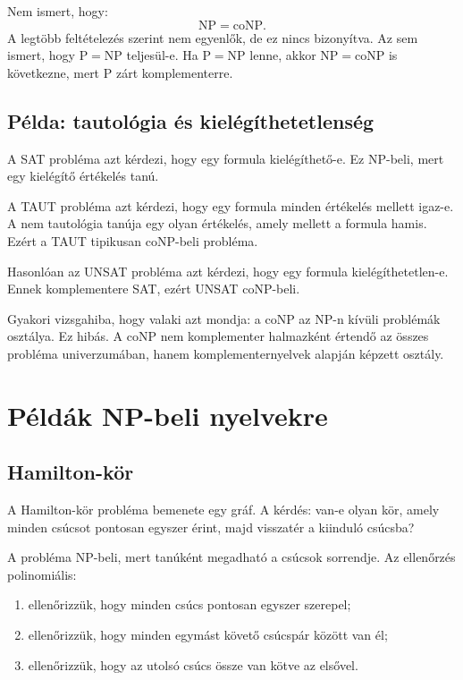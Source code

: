 Nem ismert, hogy:
\[
  \mathrm{NP}=\mathrm{coNP}.
\]
A legtöbb feltételezés szerint nem egyenlők, de ez nincs bizonyítva. Az sem ismert, hogy $\mathrm{P}=\mathrm{NP}$ teljesül-e. Ha $\mathrm{P}=\mathrm{NP}$ lenne, akkor $\mathrm{NP}=\mathrm{coNP}$ is következne, mert $\mathrm{P}$ zárt komplementerre.



\subsection{Példa: tautológia és kielégíthetetlenség}

A SAT probléma azt kérdezi, hogy egy formula kielégíthető-e. Ez $\mathrm{NP}$-beli, mert egy kielégítő értékelés tanú.

A TAUT probléma azt kérdezi, hogy egy formula minden értékelés mellett igaz-e. A nem tautológia tanúja egy olyan értékelés, amely mellett a formula hamis. Ezért a TAUT tipikusan $\mathrm{coNP}$-beli probléma.

Hasonlóan az UNSAT probléma azt kérdezi, hogy egy formula kielégíthetetlen-e. Ennek komplementere SAT, ezért UNSAT $\mathrm{coNP}$-beli.

\begin{warningbox}
Gyakori vizsgahiba, hogy valaki azt mondja: a $\mathrm{coNP}$ az $\mathrm{NP}$-n kívüli problémák osztálya. Ez hibás. A $\mathrm{coNP}$ nem komplementer halmazként értendő az összes probléma univerzumában, hanem komplementernyelvek alapján képzett osztály.
\end{warningbox}

\section{Példák NP-beli nyelvekre}

\subsection{Hamilton-kör}

A Hamilton-kör probléma bemenete egy gráf. A kérdés: van-e olyan kör, amely minden csúcsot pontosan egyszer érint, majd visszatér a kiinduló csúcsba?

A probléma $\mathrm{NP}$-beli, mert tanúként megadható a csúcsok sorrendje. Az ellenőrzés polinomiális:

\begin{enumerate}
  \item ellenőrizzük, hogy minden csúcs pontosan egyszer szerepel;
  \item ellenőrizzük, hogy minden egymást követő csúcspár között van él;
  \item ellenőrizzük, hogy az utolsó csúcs össze van kötve az elsővel.
\end{enumerate}

